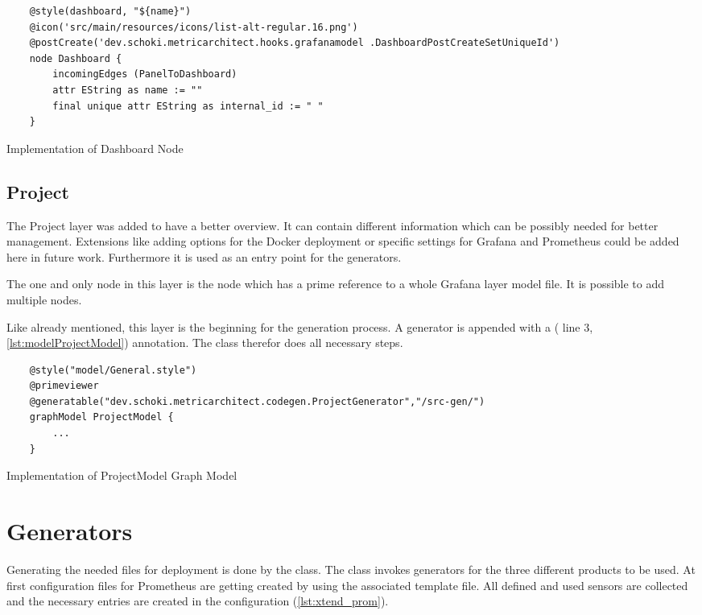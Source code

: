 \begin{listing}[!ht]
	\begin{verbatim}
	@style(dashboard, "${name}")
	@icon('src/main/resources/icons/list-alt-regular.16.png')
	@postCreate('dev.schoki.metricarchitect.hooks.grafanamodel .DashboardPostCreateSetUniqueId')
	node Dashboard {
		incomingEdges (PanelToDashboard)
		attr EString as name := ""
		final unique attr EString as internal_id := " " 
	}
	\end{verbatim}
	\caption{Implementation of Dashboard Node}
	\label{lst:nodeDashboard}
\end{listing}
\subsection{Project}
The Project layer was added to have a better overview. It can contain different information which can be possibly needed for better management. Extensions like adding options for the Docker deployment or specific settings for Grafana and Prometheus could be added here in future work. Furthermore it is used as an entry point for the generators. 

The one and only node in this layer is the  node which has a prime reference to a whole Grafana layer model file. It is possible to add multiple nodes.

Like already mentioned, this layer is the beginning for the generation process. A generator is appended with a  ( line 3, \cref{lst:modelProjectModel}) annotation. The class  therefor does all necessary steps.

\begin{listing}[!ht]
	\begin{verbatim}
	@style("model/General.style")
	@primeviewer
	@generatable("dev.schoki.metricarchitect.codegen.ProjectGenerator","/src-gen/")
	graphModel ProjectModel {
		...
	}
	\end{verbatim}
	\caption{Implementation of ProjectModel Graph Model}
	\label{lst:modelProjectModel}
\end{listing}

\section{Generators}
\label{sec:impl_generator}

Generating the needed files for deployment is done by the  class. The class invokes generators for the three different products to be used. At first configuration files for Prometheus are getting created by  using the associated template file. All defined and used sensors are collected and the necessary entries are created in the configuration (\cref{lst:xtend_prom}).

